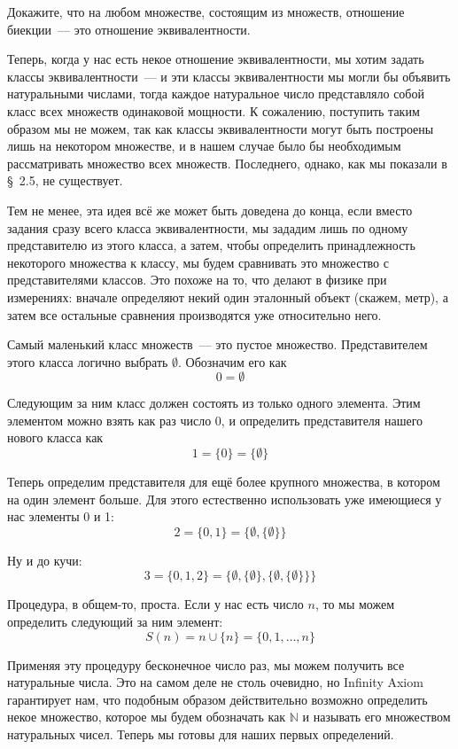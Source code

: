 \begin{exercise}
Докажите, что на любом множестве, состоящим из множеств, отношение биекции~— это отношение эквивалентности.
\end{exercise}

Теперь, когда у нас есть некое отношение эквивалентности, мы хотим задать классы эквивалентности~— и эти классы эквивалентности мы могли бы объявить натуральными числами, тогда каждое натуральное число представляло собой класс всех множеств одинаковой мощности. К сожалению, поступить таким образом мы не можем, так как классы эквивалентности могут быть построены лишь на некотором множестве, и в нашем случае было бы необходимым рассматривать множество всех множеств. Последнего, однако, как мы показали в \S~2.5, не существует.

Тем не менее, эта идея всё же может быть доведена до конца, если вместо задания сразу всего класса эквивалентности, мы зададим лишь по одному представителю из этого класса, а затем, чтобы определить принадлежность некоторого множества к классу, мы будем сравнивать это множество с представителями классов. Это похоже на то, что делают в физике при измерениях: вначале определяют некий один эталонный объект (скажем, метр), а затем все остальные сравнения производятся уже относительно него.

Самый маленький класс множеств~— это пустое множество. Представителем этого класса логично выбрать $\emptyset$. Обозначим его как $$0 = \emptyset$$

Следующим за ним класс должен состоять из только одного элемента. Этим элементом можно взять как раз число 0, и определить представителя нашего нового класса как $$1 = \{0\} = \{\emptyset\}$$

Теперь определим представителя для ещё более крупного множества, в котором на один элемент больше. Для этого естественно использовать уже имеющиеся у нас элементы 0 и 1: $$2 = \{0, 1\} = \{\emptyset, \{\emptyset\}\}$$

Ну и до кучи: $$3 = \{0, 1, 2\} = \{\emptyset, \{\emptyset\}, \{\emptyset, \{\emptyset\}\}\}$$

Процедура, в общем-то, проста. Если у нас есть число $n$, то мы можем определить следующий за ним элемент: $$S(n) = n \cup \{n\} = \{0, 1, \ldots, n\}$$

Применяя эту процедуру бесконечное число раз, мы можем получить все натуральные числа. Это на самом деле не столь очевидно, но Infinity Axiom гарантирует нам, что подобным образом действительно возможно определить некое множество, которое мы будем обозначать как $\mathbb{N}$ и называть его множеством натуральных чисел. Теперь мы готовы для наших первых определений.


